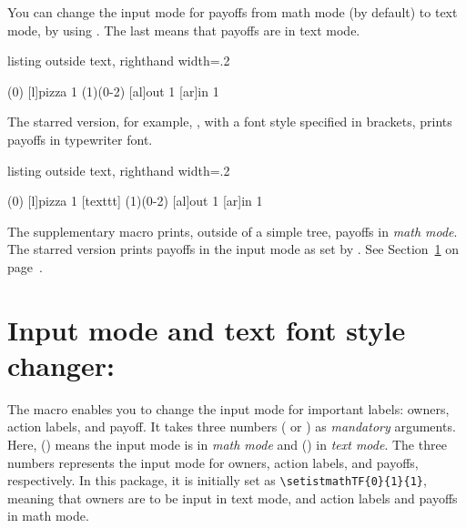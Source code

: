 You can change the input mode for payoffs from math mode (by default) to text mode,
by using . The last  means that payoffs are in text mode.

\begin{tcblisting}{listing outside text, righthand width=.2\linewidth}
\begin{istgame}
\istroot(0)
  [l]{pizza 1}    \endist
{} %
\istroot(1)(0-2)
  \istb{\alpha}[al]{out 1}  \istb{\beta}[ar]{in 1}  \endist
\end{istgame}
\end{tcblisting}

The starred version, for example, , with a font style specified in brackets, prints payoffs in typewriter font.

\begin{tcblisting}{listing outside text, righthand width=.2\linewidth}
\begin{istgame}
\istroot(0)
  [l]{pizza 1}    \endist
{}[texttt] %
\istroot(1)(0-2)
  \istb{\alpha}[al]{out 1}  \istb{\beta}[ar]{in 1}  \endist
\end{istgame}
\end{tcblisting}

The supplementary macro \cmd{\xtPayoff} prints, outside of a simple tree, payoffs in \emph{math mode}.
The starred version \cmd{\xtPayoff*} prints payoffs in the input mode as set by \cmd{\setistmathTF*}.
See Section~\ref{sec:setistmathTF} on page~\pageref{sec:setistmathTF}.


\section{Input mode and text font style changer: \protect\cmd{\setistmathTF(*)}}
\label{sec:setistmathTF}

The macro \icmd{\setistmathTF} enables you to change the input mode for important labels: owners, action labels, and payoff.
It takes three numbers ( or ) as \emph{mandatory} arguments.  Here,  () means the input mode is in \emph{math mode} and  () in \emph{text mode}.
The three numbers represents the input mode for owners, action labels, and payoffs, respectively.
In this package, it is initially set as \verb|\setistmathTF{0}{1}{1}|, meaning that owners are to be input in text mode, and action labels and payoffs in math mode.

